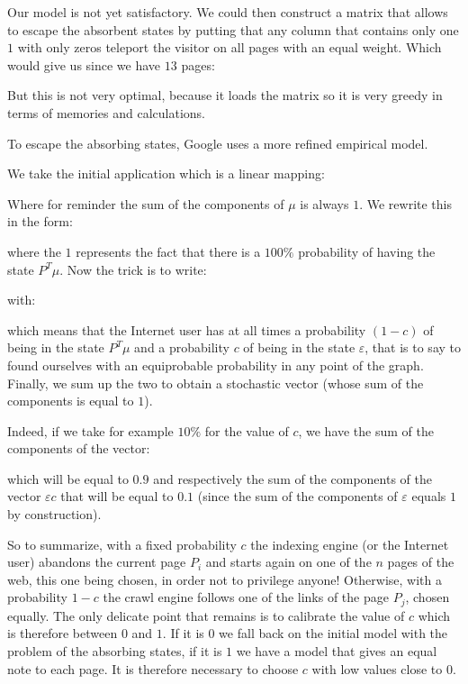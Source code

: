 	Our model is not yet satisfactory. We could then construct a matrix that allows to escape the absorbent states by putting that any column that contains only one $1$ with only zeros teleport the visitor on all pages with an equal weight. Which would give us since we have $13$ pages:
	\setcounter{MaxMatrixCols}{20}
	
	But this is not very optimal, because it loads the matrix so it is very greedy in terms of memories and calculations.

	To escape the absorbing states, Google uses a more refined empirical model.

	We take the initial application which is a linear mapping:
	
	Where for reminder the sum of the components of $\mu$ is always $1$. We rewrite this in the form:
	
	where the $1$ represents the fact that there is a $100\%$ probability of having the state $P^T\mu$. Now the trick is to write:
	
	with:
	
	which means that the Internet user has at all times a probability $(1-c)$ of being in the state $P^T\mu$ and a probability $c$ of being in the state $\varepsilon$, that is to say to found ourselves with an equiprobable probability in any point of the graph. Finally, we sum up the two to obtain a stochastic vector (whose sum of the components is equal to $1$).

	Indeed, if we take for example $10\%$ for the value of $c$, we have the sum of the components of the vector:
	
	which will be equal to $0.9$ and respectively the sum of the components of the vector $\varepsilon c$ that will be equal to $0.1$ (since the sum of the components of $\varepsilon$ equals $1$ by construction).
	
	So to summarize, with a fixed probability $c$ the indexing engine (or the Internet user) abandons the current page $P_i$ and starts again on one of the $n$ pages of the web, this one being chosen, in order not to privilege anyone! Otherwise, with a probability $1-c$ the crawl engine follows one of the links of the page $P_j$, chosen equally. The only delicate point that remains is to calibrate the value of $c$ which is therefore between $0$ and $1$. If it is $0$ we fall back on the initial model with the problem of the absorbing states, if it is $1$ we have a model that gives an equal note to each page. It is therefore necessary to choose $c$ with low values close to $0$.

